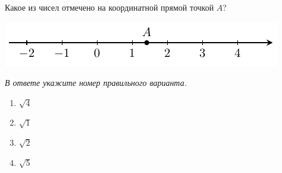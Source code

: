 Какое из чисел отмечено на координатной прямой точкой $A$?
\begin{center}
	\includegraphics[align=t,]{graphs/graph_1/graph_1}
\end{center}

\textit{В ответе укажите номер правильного варианта.}
\begin{multicols}{4}
	\begin{enumerate}[label=\arabic*)]
		\item $\sqrt{4}$
		\item $\sqrt{1}$
		\item $\sqrt{2}$
		\item $\sqrt{5}$
	\end{enumerate}
\end{multicols}